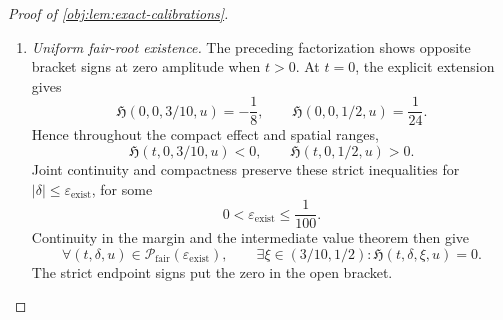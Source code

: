\begin{proof}[Proof of \cref{obj:lem:exact-calibrations}]
\begin{enumerate}
We also need position independence at zero amplitude. The sign moments are
\[
EZ_u=0,\qquad EZ_u^2
=\cos^2(\pi u/2)+\sin^2(\pi u/2)=1.
\]
Differentiating the averaged risk twice in amplitude gives
\[
\left.
\partial_\delta^2 E\mathsf G(t,\xi+\delta Z_u)
\right|_{\delta=0}
=
-\frac{2e^td}{(1+d\xi)^3}.
\]
The comparator term has no spatial argument, so
\[
\partial_\delta^2
\mathcal R_{\mathrm{fair}}(t,0,\xi,u)
=
\partial_\delta^2
\mathcal R_{\mathrm{fair}}(t,0,\xi,0).
\]
Their effect derivatives agree as well, including at the endpoints of the effect interval by smoothness and the one-sided derivative there. Substitution in the double integral proves
\[
\mathfrak H(t,0,\xi,u)=\mathfrak H(t,0,\xi,0).
\]

For zero effect, differentiation of the explicit comparator gives
\[
\partial_t\mathsf T(0,\delta)=1-\frac{\delta^2}{6/25},
\qquad
\partial_t\mathsf G(0,\xi)=\xi(1-\xi).
\]
Using the two sign moments,
\[
\partial_t\mathcal R_{\mathrm{fair}}(0,\delta,\xi,u)
=
\delta^2\left(-1+\frac{\xi(1-\xi)}{6/25}\right).
\]
Differentiate the undivided Taylor identity at \(t=0\). For \(\delta\ne0\), cancellation of \(\delta^2\) gives the first identity below; continuity in \(\delta\) supplies the same identity at \(\delta=0\):
\[
\mathfrak H(0,\delta,\xi,u)
=-1+\frac{\xi(1-\xi)}{6/25},
\qquad
\mathfrak H(0,\delta,\xi,u)=0
\ \Longleftrightarrow\
(\xi-\tfrac25)(\xi-\tfrac35)=0.
\]
Within \((3/10,1/2)\), the zero is therefore \(p_*\).
Combining these facts yields
\[
\mathfrak H(t,0,p_*,u)=0,
\qquad
\mathfrak H(t,0,\xi,u)=0,\quad \xi\in(3/10,1/2)
\ \Longrightarrow\ \xi=p_*.
\]
Here \(t=0\) uses the explicit quadratic formula, and \(t>0\) uses the negative residual factor.

\item \emph{Uniform fair-root existence.}
The preceding factorization shows opposite bracket signs at zero amplitude when \(t>0\). At \(t=0\), the explicit extension gives
\[
\mathfrak H(0,0,3/10,u)=-\frac18,
\qquad
\mathfrak H(0,0,1/2,u)=\frac1{24}.
\]
Hence throughout the compact effect and spatial ranges,
\[
\mathfrak H(t,0,3/10,u)<0,
\qquad
\mathfrak H(t,0,1/2,u)>0.
\]
Joint continuity and compactness preserve these strict inequalities for
\(|\delta|\le\varepsilon_{\mathrm{exist}}\), for some
\[
0<\varepsilon_{\mathrm{exist}}\le\frac1{100}.
\]
Continuity in the margin and the intermediate value theorem then give
\[
\forall(t,\delta,u)\in
\mathcal P_{\mathrm{fair}}(\varepsilon_{\mathrm{exist}}),
\qquad
\exists\xi\in(3/10,1/2):
\mathfrak H(t,\delta,\xi,u)=0.
\]
The strict endpoint signs put the zero in the open bracket.


\end{enumerate}
\end{proof}
